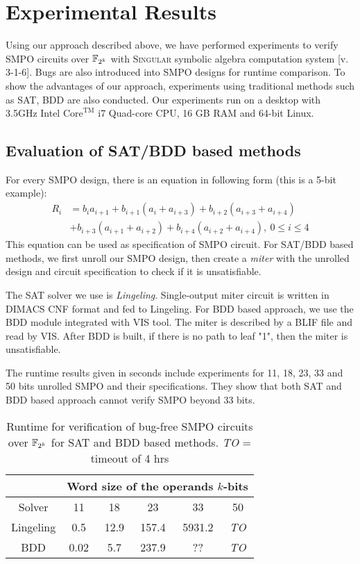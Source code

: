 \section{Experimental Results}
\label{sec:result}
Using our approach described above, we have performed experiments to verify SMPO circuits over ${\mathbb{F}}_{2^k}$ with \textsc{Singular} symbolic algebra computation system [v. 3-1-6]\cite{Singular}. 
Bugs are also introduced into SMPO designs for runtime comparison. To show the advantages of our approach, experiments using traditional methods such as SAT, 
BDD are also conducted. Our experiments run on a desktop with 3.5GHz Intel $\text{Core}^\text{TM}$ i7 Quad-core CPU, 16 GB RAM and 64-bit Linux.

\subsection{Evaluation of SAT/BDD based methods}
For every SMPO design, there is an equation in following form (this is a 5-bit example):
\begin{align}
R_i &= b_ia_{i+1} + b_{i+1}(a_i + a_{i+3}) + b_{i+2}(a_{i+3} + a_{i+4}) \nonumber\\
&+ b_{i+3}(a_{i+1} + a_{i+2}) + b_{i+4}
(a_{i+2} + a_{i+4}),\ 0\leq i\leq 4 \nonumber
\end{align}
This equation can be used as specification of SMPO circuit. For SAT/BDD based methods,
we first unroll our SMPO design, then create a \emph{miter} with the unrolled design and
circuit specification to check if it is unsatisfiable.

The SAT solver we use is \emph{Lingeling}\cite{Lingeling}. Single-output miter circuit is written
in DIMACS CNF\cite{dimacs} format and fed to Lingeling. For BDD based approach, we use the BDD module integrated
with VIS tool. The miter is described by a BLIF file and read by VIS\cite{VIS}. After BDD is built, if there is
no path to leaf "1", then the miter is unsatisfiable.

The runtime results given in seconds include experiments for 11, 18, 23, 33 and 50 bits unrolled SMPO
and their specifications. They show that both SAT and BDD based approach 
cannot verify SMPO beyond 33 bits.

\begin{table}[h]
\centering
\begin{tabular}{|c||c|c|c|c|c|} 
\hline
& \multicolumn{5}{|c|}{Word size of the operands $k$-bits}  \\
\hline
Solver & 11 & 18 & 23 & 33 & 50\\
\hline
\hline
Lingeling & 0.5  & 12.9  & 157.4 & 5931.2 & \emph{TO}\\
\hline
\hline
BDD & 0.02 & 5.7 & 237.9 & ?? & \emph{TO} \\
\hline
\end{tabular}
\caption{Runtime for verification of bug-free SMPO circuits over ${\mathbb{F}}_{2^k}$ for SAT and BDD based methods. \emph{TO} = timeout of 4 hrs}\label{table:satbdd}  
\end{table}

